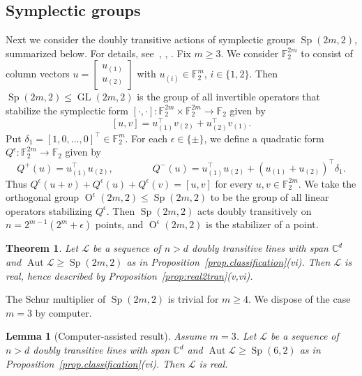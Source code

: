 \documentclass[11pt]{article}
\newtheorem{theorem}[theo]{Theorem}
\newtheorem{lemma}[theo]{Lemma}
\theoremstyle{definition}
\numberwithin{equation}{section}
\begin{document}
\subsection{Symplectic groups}
\label{subsec:symplectic}
Next we consider the doubly transitive actions of symplectic groups $\operatorname{Sp}(2m,2)$, summarized below.
For details, see~\cite[Section~7.7]{DixonMortimer:96}, \cite[Chapters 12--14]{Grove:02}, \cite[Chapter~2]{KleidmanLiebeck:90}.
Fix $m \geq 3$.
We consider $\mathbb{F}_2^{2m}$ to consist of column vectors $u = \left[ \begin{array}{c} u_{(1)} \\ u_{(2)} \end{array} \right]$ with $u_{(i)} \in \mathbb{F}_2^m$, $i\in\{1,2\}$.
Then $\operatorname{Sp}(2m,2) \leq \operatorname{GL}(2m,2)$ is the group of all invertible operators that stabilize the symplectic form $[\cdot ,\cdot] \colon \mathbb{F}_2^{2m} \times \mathbb{F}_2^{2m} \to \mathbb{F}_2$ given by
\[ [u,v] = u_{(1)}^\top v_{(2)} + u_{(2)}^\top v_{(1)}. \]
Put $\delta_1 = [1,0,\dotsc,0]^\top \in \mathbb{F}_2^m$.
For each $\epsilon \in \{ \pm \}$, we define a quadratic form $Q^\epsilon \colon \mathbb{F}_2^{2m} \to \mathbb{F}_2$ given by
\[
Q^+(u) = u_{(1)}^\top u_{(2)},
\qquad
\qquad
Q^-(u) = u_{(1)}^\top u_{(2)} + (u_{(1)} + u_{(2)})^\top \delta_1.
\]
Thus $Q^\epsilon(u+v) + Q^\epsilon(u) + Q^\epsilon(v) = [u,v]$ for every $u,v \in \mathbb{F}_2^{2m}$.
We take the orthogonal group $\operatorname{O}^\epsilon(2m,2) \leq \operatorname{Sp}(2m,2)$ to be the group of all linear operators stabilizing $Q^\epsilon$.
Then $\operatorname{Sp}(2m,2)$ acts doubly transitively on $n = 2^{m-1}(2^m + \epsilon)$ points, and $\operatorname{O}^\epsilon(2m,2)$ is the stabilizer of a point.


\begin{theorem}
\label{thm:Sp2m2}
Let $\mathscr{L}$ be a sequence of $n > d$ doubly transitive lines with span $\mathbb{C}^d$ and $\operatorname{Aut} \mathscr{L} \geq \operatorname{Sp}(2m,2)$ as in Proposition~\ref{prop.classification}(vi).
Then $\mathscr{L}$ is real, hence described by Proposition~\ref{prop:real2tran}(v,vi).
\end{theorem}

The Schur multiplier of $\operatorname{Sp}(2m,2)$ is trivial for $m \geq 4$.
We dispose of the case $m=3$ by computer.

\begin{lemma}[Computer-assisted result]
Assume $m=3$.
Let $\mathscr{L}$ be a sequence of $n > d$ doubly transitive lines with span $\mathbb{C}^d$ and $\operatorname{Aut} \mathscr{L} \geq \operatorname{Sp}(6,2)$ as in Proposition~\ref{prop.classification}(vi).
Then $\mathscr{L}$ is real.
\end{lemma}
\end{document}

